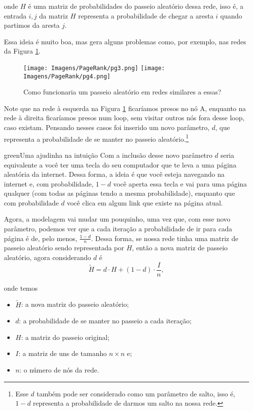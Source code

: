 \documentclass{article}
\begin{document}
\noindent onde $H$ é uma matriz de probabilidades do passeio aleatório dessa rede, isso é, a entrada $i, j$ da matriz $H$ representa a probabilidade de chegar a aresta $i$ quando partimos da aresta $j$.

Essa ideia é muito boa, mas gera alguns problemas como, por exemplo, nas redes da Figura \ref{ex}.
\begin{figure}[H]
    \centering
    \texttt{[image: Imagens/PageRank/pg3.png]}
    \texttt{[image: Imagens/PageRank/pg4.png]}
    \caption{Como funcionaria um passeio aleatório em redes similares a essas?}
    \label{ex}
\end{figure}

Note que na rede à esquerda na Figura \ref{ex} ficaríamos presos no nó A, enquanto na rede à direita ficaríamos presos num loop, sem visitar outros nós fora desse loop, caso existam. Pensando nesses casos foi inserido um novo parâmetro, $d$, que representa a probabilidade de se manter no passeio aleatório.\footnote{Esse $d$ também pode ser considerado como um parâmetro de salto, isso é, $1 - d$ representa a probabilidade de darmos um salto na nossa rede.}

\begin{mybox}{green}{Uma ajudinha na intuição}
    Com a inclusão desse novo parâmetro $d$ seria equivalente a você ter uma tecla do seu computador que te leva a uma página aleatória da internet. Dessa forma, a ideia é que você esteja navegando na internet e, com probabilidade, $1 - d$ você aperta essa tecla e vai para uma página qualquer (com todas as páginas tendo a mesma probabilidade), enquanto que com probabilidade $d$ você clica em algum link que existe na página atual.
\end{mybox}

Agora, a modelagem vai mudar um pouquinho, uma vez que, com esse novo parâmetro, podemos ver que a cada iteração a probabilidade de ir para cada página é de, pelo menos, $\frac{1 - d}{n}$. Dessa forma, se nossa rede tinha uma matriz de passeio aleatório sendo representada por $H$, então a nova matriz de passeio aleatório, agora considerando $d$ é
\[\tilde{H} = d\cdot H + (1 - d)\cdot \dfrac{I}{n},\]

\noindent onde temos
\begin{itemize}
    \item
        $\tilde{H}$: a nova matriz do passeio aleatório;
        
    \item
        $d$: a probabilidade de se manter no passeio a cada iteração;
        
    \item
        $H$: a matriz do passeio original;
        
    \item
        $I$: a matriz de uns de tamanho $n\times n$ e;
        
    \item
        $n$: o número de nós da rede.
\end{itemize}
\end{document}

